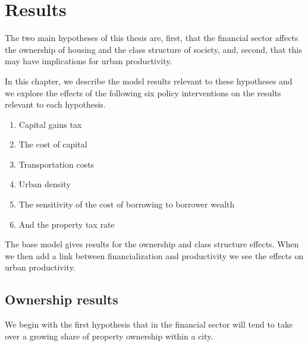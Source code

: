 \chapter{Results} \label{chapter-results}

The two main hypotheses of this thesis are, first, that the financial sector affects the ownership of housing and the class structure of society, and, second, that this may have implications for urban productivity.  


In this chapter, we describe the model results relevant to these hypotheses and we explore the effects of the following six policy interventions on the results relevant to each hypothesis.

\begin{enumerate}
\item Capital gains tax
\item The cost of capital
\item Transportation costs
\item Urban density
\item The sensitivity of the cost of borrowing to borrower wealth
\item And the property tax rate
\end{enumerate}

The base model gives results for the ownership and class structure effects. When we then add a link between financialization and productivity we see the effects on urban productivity. 

\section{Ownership results}
We begin with the first hypothesis that in %
the financial sector will tend to take over a growing share of property ownership within a city. 

